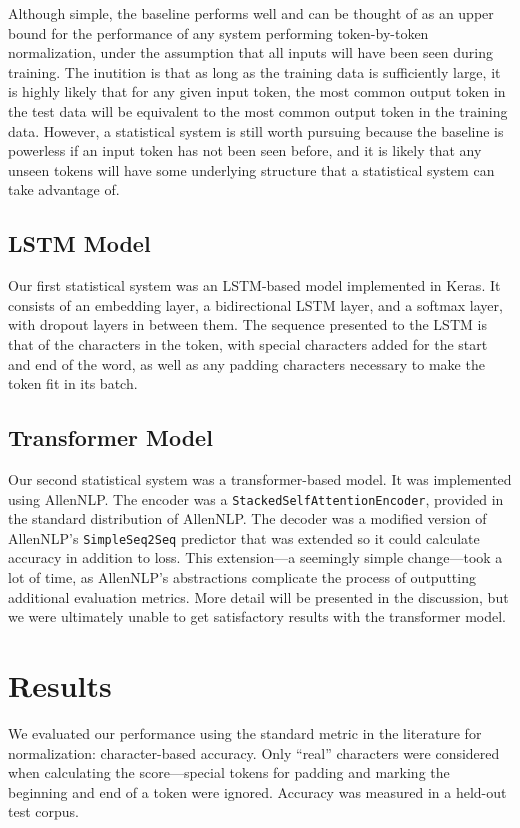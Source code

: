 \documentclass[11pt,a4paper]{article}
\begin{document}
Although simple, the baseline performs well and can be thought of as an upper bound for the performance of any system performing token-by-token normalization, under the assumption that all inputs will have been seen during training. The inutition is that as long as the training data is sufficiently large, it is highly likely that for any given input token, the most common output token in the test data will be equivalent to the most common output token in the training data. However, a statistical system is still worth pursuing because the baseline is powerless if an input token has not been seen before, and it is likely that any unseen tokens will have some underlying structure that a statistical system can take advantage of.

\subsection{LSTM Model}
Our first statistical system was an LSTM-based model implemented in Keras. It consists of an embedding layer, a bidirectional LSTM layer, and a softmax layer, with dropout layers in between them. The sequence presented to the LSTM is that of the characters in the token, with special characters added for the start and end of the word, as well as any padding characters necessary to make the token fit in its batch.

\subsection{Transformer Model}
Our second statistical system was a transformer-based model. It was implemented using AllenNLP. The encoder was a \texttt{StackedSelfAttentionEncoder}, provided in the standard distribution of AllenNLP. The decoder was a modified version of AllenNLP’s \texttt{SimpleSeq2Seq} predictor that was extended so it could calculate accuracy in addition to loss. This extension---a seemingly simple change---took a lot of time, as AllenNLP’s abstractions complicate the process of outputting additional evaluation metrics. More detail will be presented in the discussion, but we were ultimately unable to get satisfactory results with the transformer model.

\section{Results}
We evaluated our performance using the standard metric in the literature for normalization: character-based accuracy. Only ``real'' characters were considered when calculating the score---special tokens for padding and marking the beginning and end of a token were ignored. Accuracy was measured in a held-out test corpus.
\end{document}

